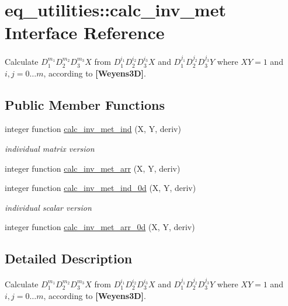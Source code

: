 \hypertarget{interfaceeq__utilities_1_1calc__inv__met}{}\section{eq\+\_\+utilities\+:\+:calc\+\_\+inv\+\_\+met Interface Reference}
\label{interfaceeq__utilities_1_1calc__inv__met}


Calculate $D_1^{m_1} D_2^{m_2} D_3^{m_3} X$ from $D_1^{i_1} D_2^{i_2} D_3^{i_3} X$ and $D_1^{j_1} D_2^{j_2} D_3^{j_3} Y$ where $XY=1$ and $i,j = 0\ldots m$, according to {\bfseries [Weyens3D]}.  


\subsection*{Public Member Functions}
\begin{DoxyCompactItemize}
\item 
integer function \hyperlink{interfaceeq__utilities_1_1calc__inv__met_a52032d5ed98c02aa25ec4ee8489d3452}{calc\+\_\+inv\+\_\+met\+\_\+ind} (X, Y, deriv)
\begin{DoxyCompactList}\small\item\em individual matrix version \end{DoxyCompactList}\item 
integer function \hyperlink{interfaceeq__utilities_1_1calc__inv__met_a82b49d5a135cc6bdd47fd3e95af3ed38}{calc\+\_\+inv\+\_\+met\+\_\+arr} (X, Y, deriv)
\item 
integer function \hyperlink{interfaceeq__utilities_1_1calc__inv__met_a6d60c210f6a6db200d329b2c5748ef9b}{calc\+\_\+inv\+\_\+met\+\_\+ind\+\_\+0d} (X, Y, deriv)
\begin{DoxyCompactList}\small\item\em individual scalar version \end{DoxyCompactList}\item 
integer function \hyperlink{interfaceeq__utilities_1_1calc__inv__met_aea4faf0a5944ca034e7db4b0c2f26043}{calc\+\_\+inv\+\_\+met\+\_\+arr\+\_\+0d} (X, Y, deriv)
\end{DoxyCompactItemize}


\subsection{Detailed Description}
Calculate $D_1^{m_1} D_2^{m_2} D_3^{m_3} X$ from $D_1^{i_1} D_2^{i_2} D_3^{i_3} X$ and $D_1^{j_1} D_2^{j_2} D_3^{j_3} Y$ where $XY=1$ and $i,j = 0\ldots m$, according to {\bfseries [Weyens3D]}. 

